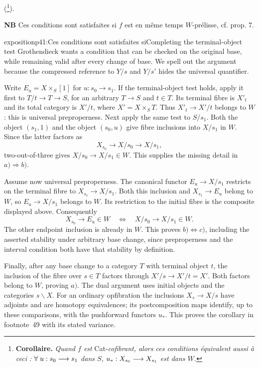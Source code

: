 (\footnote[49]{\textbf{Corollaire.} \textit{Quand $f$ est} Cat-\textit{cofibrant, alors ces conditions équivalent aussi à ceci : $\forall\; u : s_0\longrightarrow s_1$ dans $S$, $u_* : X_{s_0}\longrightarrow X_{s_1}$ est dans $W$.}}).

\textbf{NB} Ces conditions sont satisfaites si $f$ est en même temps $W$-prélisse, cf. prop. 7.

\begin{dcomment}{exposition}{p41:Ces conditions sont satisfaites si}{Completing the terminal-object test}
Grothendieck wants a condition that can be checked on the original base, while remaining valid after every change of base. We spell out the argument because the compressed reference to $Y/s$ and $Y/s'$ hides the universal quantifier.

Write $E_u=X\times_S[1]$ for $u:s_0\to s_1$. If the terminal-object test holds, apply it first to $T/t\to T\to S$, for an arbitrary $T\to S$ and $t\in T$. Its terminal fibre is $X'_t$ and its total category is $X'/t$, where $X'=X\times_ST$. Thus $X'_t\to X'/t$ belongs to $W$: this is universal preproperness. Next apply the same test to $S/s_1$. Both the object $(s_1,1)$ and the object $(s_0,u)$ give fibre inclusions into $X/s_1$ in $W$. Since the latter factors as
\[
 X_{s_0}\longrightarrow X/s_0\longrightarrow X/s_1,
\]
two-out-of-three gives $X/s_0\to X/s_1\in W$. This supplies the missing detail in $a)\Rightarrow b)$.

Assume now universal preproperness. The canonical functor $E_u\to X/s_1$ restricts on the terminal fibre to $X_{s_1}\to X/s_1$. Both this inclusion and $X_{s_1}\to E_u$ belong to $W$, so $E_u\to X/s_1$ belongs to $W$. Its restriction to the initial fibre is the composite displayed above. Consequently
\[
 X_{s_0}\to E_u\in W
 \quad\Longleftrightarrow\quad
 X/s_0\to X/s_1\in W.
\]
The other endpoint inclusion is already in $W$. This proves $b)\Longleftrightarrow c)$, including the asserted stability under arbitrary base change, since preproperness and the interval condition both have that stability by definition.

Finally, after any base change to a category $T$ with terminal object $t$, the inclusion of the fibre over $s\in T$ factors through $X'/s\to X'/t=X'$. Both factors belong to $W$, proving $a)$. The dual argument uses initial objects and the categories $s\backslash X$. For an ordinary opfibration the inclusions $X_s\to X/s$ have adjoints and are homotopy equivalences; its postcomposition maps identify, up to these comparisons, with the pushforward functors $u_*$. This proves the corollary in footnote~49 with its stated variance.
\end{dcomment}


